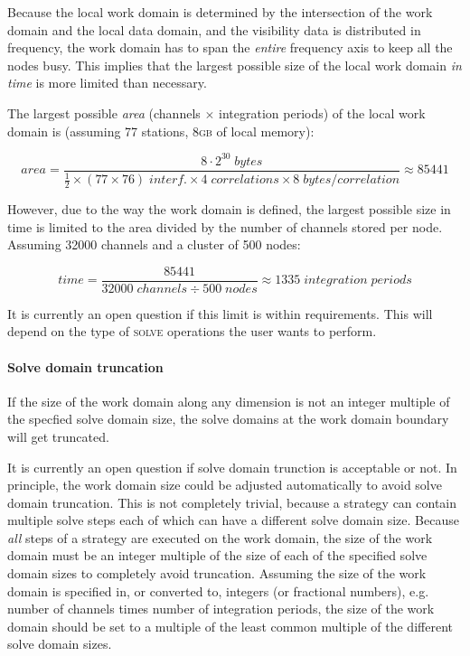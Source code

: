 \documentclass[10pt]{lofar}
\newcommand{\solve}{\textsc{solve}\xspace}
\begin{document}
Because the local work domain is determined by the intersection of the work
domain and the local data domain, and the visibility data is distributed in
frequency, the work domain has to span the \emph{entire} frequency axis to keep
all the nodes busy. This implies that the largest possible size of the local
work domain \emph{in time} is more limited than necessary.

The largest possible \emph{area} (channels $\times$ integration periods) of the
local work domain is (assuming 77 stations, 8\textsc{gb} of local memory):

\[
area=\frac{8\cdot2^{30}\;bytes}{\frac{1}{2}\times(77 \times 76) \; interf.
\times 4 \; correlations \times 8 \; bytes/correlation} \approx 85441
\]

However, due to the way the work domain is defined, the largest possible size in
time is limited to the area divided by the number of channels stored per node.
Assuming 32000 channels and a cluster of 500 nodes:

\[
time=\frac{85441}{32000\;channels \div 500\;nodes} \approx 1335\;integration\;
periods
\]

It is currently an open question if this limit is within requirements. This will
depend on the type of \solve operations the user wants to perform.

\paragraph{Solve domain truncation}

If the size of the work domain along any dimension is not an integer multiple of
the specfied solve domain size, the solve domains at the work domain boundary
will get truncated. 

It is currently an open question if solve domain trunction is acceptable or not.
In principle, the work domain size could be adjusted automatically to avoid
solve domain truncation. This is not completely trivial, because a strategy can
contain multiple solve steps each of which can have a different solve domain
size. Because \emph{all} steps of a strategy are executed on the work domain,
the size of the work domain must be an integer multiple of the size of each of
the specified solve domain sizes to completely avoid truncation. Assuming the
size of the work domain is specified in, or converted to, integers (or
fractional numbers), e.g. number of channels times number of integration
periods, the size of the work domain should be set to a multiple of the least
common multiple of the different solve domain sizes.
\end{document}
